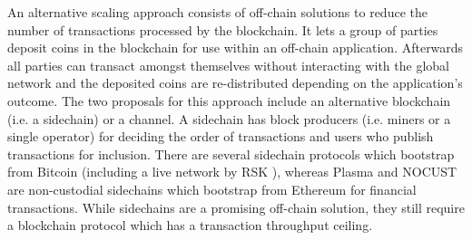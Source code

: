 \documentclass{llncs}
\begin{document}
An alternative scaling approach consists of off-chain solutions to reduce the number of transactions processed by the blockchain.
It lets a group of parties deposit coins in the blockchain for use within an off-chain application.
Afterwards all parties can transact amongst themselves without interacting with the global network and the deposited coins are re-distributed depending on the application's outcome. 
The two proposals for this approach include an alternative blockchain (i.e. a sidechain) or a channel. 
A sidechain has block producers (i.e. miners or a single operator) for deciding the order of transactions and users who publish transactions for inclusion. 
There are several sidechain protocols \cite{back2014enabling,dilley2016strong} which bootstrap from Bitcoin (including a live network by RSK \cite{sidechainrsk}), whereas Plasma\cite{poon2017plasma} and NOCUST\cite{khalilnocust} are non-custodial sidechains which bootstrap from Ethereum for financial transactions.
While sidechains are a promising off-chain solution, they still require a blockchain protocol which has a transaction throughput ceiling.
\end{document}
